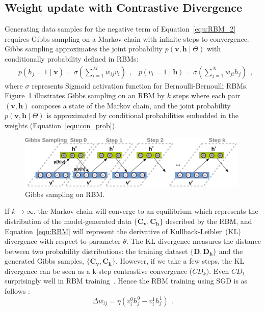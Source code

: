 \subsection{Weight update with Contrastive Divergence}
\label{sec:cd}
Generating data samples for the negative term of Equation~\ref{equ:RBM_2} requires Gibbs sampling on a Markov chain with \protect{} infinite \protect{} steps to convergence.
Gibbs sampling approximates the joint probability $p( \mathbf{v}, \mathbf{h} \mid  \Theta)$ with \protect{} conditionally probability defined in RBMs:
\begin{equation}
\begin{aligned}
& p(h_j = 1 \mid \mathbf{v}) = \sigma(\sum_{i=1}^{M} w_{ij} v_i)~~,
& p(v_i = 1 \mid \mathbf{h}) = \sigma(\sum_{j=1}^{N} w_{ji} h_j)~~,
\end{aligned}
\label{equ:con_prob}
\end{equation} 
where $\sigma$ represents \protect{} Sigmoid activation function for Bernoulli-Bernoulli RBMs.
Figure~\ref{fig:gibbs} illustrates \protect{} Gibbs sampling on an RBM by $k$ steps where each pair \protect{} $(\mathbf{v}, \mathbf{h})$ composes a state of the Markov chain, and the joint probability $p( \mathbf{v}, \mathbf{h} \mid  \Theta)$ is approximated by conditional probabilities embedded in the weights (Equation~\ref{equ:con_prob}).

\begin{figure}[hbt]
	\centering
	\includegraphics[width=0.98\textwidth]{pics_sdlm/gibbs_sampling.pdf}
	\caption{Gibbs sampling on \protect{} \protect{} RBM.}
	\label{fig:gibbs}
\end{figure}

If $ k \to \infty $, the Markov chain will converge to an equilibrium which represents the distribution of the model-generated data $\{\mathbf{C_v}, \mathbf{C_h}\}$ described by the RBM, and Equation~\ref{equ:RBM} will represent the derivative of \protect{} Kullback-Leibler~(KL) divergence with respect to parameter $\theta$.
The KL divergence measures the distance between two probability distributions: the training dataset $\{\mathbf{D}, \mathbf{D_h}\}$ and the generated Gibbs samples, $\{\mathbf{C_v}, \mathbf{C_h}\}$.
However, if we \protect{} take \protect{} a few steps, the KL divergence can be seen as a k-step contrastive convergence ($ CD_{k}) $.
Even $ CD_1 $ \protect{} \protect{} surprisingly well in RBM training~\citep{hinton2002training}.
Hence the RBM training using SGD is as follows :
\begin{equation}
\Delta w_{ij} = \eta (v^0_i h^0_j-v^1_i h^1_j)~~.
\label{equ:rbm_train}
\end{equation}




